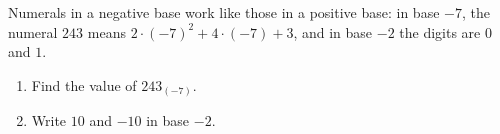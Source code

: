 Numerals in a negative base work like those in a positive base: in base $-7$, the numeral $243$ means $2\cdot(-7)^2+4\cdot(-7)+3$, and in base $-2$ the digits are $0$ and $1$.
\begin{enumerate}
\item[(a)] Find the value of $243_{(-7)}$.
\item[(b)] Write $10$ and $-10$ in base $-2$.
\end{enumerate}
